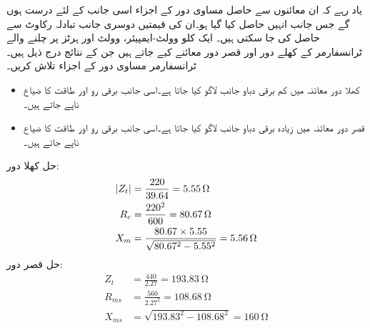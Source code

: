 یاد رہے کہ ان معائنوں سے حاصل مساوی دور کے  اجزاء اسی جانب کے لئے درست ہوں گے جس جانب انہیں حاصل کیا گیا ہو۔ان کی قیمتیں دوسری جانب تبادلہ رکاوٹ سے حاصل کی جا سکتی ہیں۔ 
%
ایک   کلو وولٹ-ایمپیئر،  وولٹ اور  ہرٹز پر چلنے والے ٹرانسفارمر کے کھلے دور اور قصر دور معائنے کیے جاتے ہیں جن کے نتائج درج ذیل ہیں۔ ٹرانسفارمر مساوی دور کے اجزاء تلاش کریں۔
\begin{itemize}
\item
کھلا دور معائنہ میں کم برقی دباو جانب   لاگو کیا جاتا ہے۔اسی جانب برقی رو  اور طاقت کا ضیاع  ناپے جاتے ہیں۔
\item
قصر دور معائنہ میں زیادہ برقی دباو جانب   لاگو کیا جاتا ہے۔اسی جانب برقی رو  اور طاقت کا ضیاع  ناپے جاتے ہیں۔
\end{itemize}

حل کھلا دور:
\begin{align*}
\abs{Z_t}&=\frac{220}{39.64}=\SI{5.55}{\ohm}\\
R_c&=\frac{220^2}{600}=\SI{80.67}{\ohm}\\
X_m&=\frac{80.67 \times 5.55}{\sqrt{80.67^2-5.55^2}}=\SI{5.56}{\ohm}
\end{align*}
حل قصر دور:
\begin{align*}
Z_t&=\frac{440}{2.27}=\SI{193.83}{\ohm}\\
R_{ms}&=\frac{560}{2.27^2}=\SI{108.68}{\ohm}\\
X_{ms}&=\sqrt{193.83^2-108.68^2}=\SI{160}{\ohm}
\end{align*}


